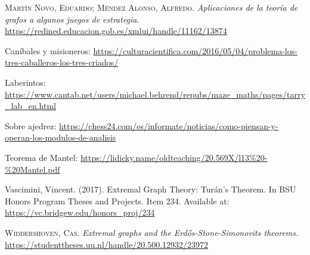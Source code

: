 \documentclass[12pt,a4paper]{book}
\begin{document}
\begin{thebibliography}{X}
     \textsc{Martín Novo, Eduardo; Méndez Alonso, Alfredo}.
    \textit{Aplicaciones de la teoría de grafos a algunos juegos de estrategia.}
    \url{https://redined.educacion.gob.es/xmlui/handle/11162/13874}

     Caníbales y misioneros: \url{https://culturacientifica.com/2016/05/04/problema-los-tres-caballeros-los-tres-criados/}

     Laberintos: \url{https://www.cantab.net/users/michael.behrend/repubs/maze_maths/pages/tarry_lab_en.html}
    
     Sobre ajedrez: \url{https://chess24.com/es/informate/noticias/como-piensan-y-operan-los-modulos-de-analisis}

     Teorema de Mantel: \url{https://lidicky.name/oldteaching/20.569X/l13%20-%20Mantel.pdf}

     Vascimini, Vincent. (2017). Extremal Graph Theory: Turán’s Theorem. 
    In BSU Honors Program Theses and Projects. Item 234. Available at: \url{https://vc.bridgew.edu/honors_proj/234}

     \textsc{Widdershoven, Cas.} \textit{Extremal graphs and the Erd{\H{o}}s-Stone-Simonovits theorems.}
    \url{https://studenttheses.uu.nl/handle/20.500.12932/23972}

\end{thebibliography}
\end{document}
